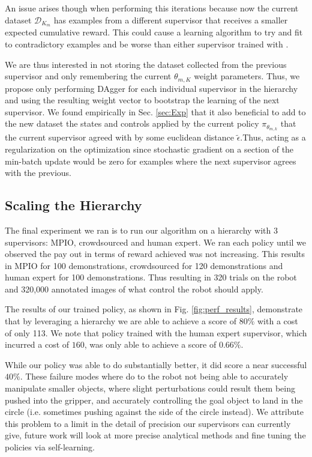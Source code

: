 \documentclass[10pt, conference]{ieeeconf}      %
\begin{document}
An issue arises though when performing this iterations because now the current dataset $\mathcal{D}_{K_m}$ has examples from a different supervisor that receives a smaller expected cumulative reward. This could cause a learning algorithm to try and fit to contradictory examples  and be worse than either supervisor trained with \cite{scholkopf2002learning}.

We are thus interested in not storing the dataset collected from the previous supervisor and only remembering the current $\theta_{m,K}$ weight parameters. Thus, we propose only performing DAgger for each individual supervisor in the hierarchy and using the resulting weight vector to bootstrap the learning of the next supervisor. We found empirically in Sec. \ref{sec:Exp} that it also beneficial to add to the new dataset the states and controls applied by the current policy $\pi_{\theta_{m,k}}$ that the current supervisor agreed with by some euclidean distance $\tilde{\epsilon}$.Thus, acting as a regularization on the optimization since stochastic gradient on a section of the min-batch update would be zero for examples where the next supervisor agrees with the previous. 



\subsection{Scaling the Hierarchy}
The final experiment we ran is to run our algorithm on a hierarchy with 3 supervisors: MPIO, crowdsourced and human expert. We ran each policy until we observed the pay out in terms of reward achieved was not increasing. This results in MPIO for 100 demonstrations, crowdsourced for 120 demonstrations and human expert for 100 demonstrations. Thus resulting in 320 trials on the robot and 320,000 annotated images of what control the robot should apply. 

The results of our trained policy, as shown in Fig. \ref{fig:perf_results}, demonstrate that by leveraging a hierarchy we are able to achieve a score of $80\%$ with a cost of only 113. We note that policy trained with the human expert supervisor, which incurred a cost of $160$, was only able to achieve a score of $0.66\%$. 

While our policy was able to do substantially better, it did score a near successful  $40\%$. These failure modes where do to the robot not being able to accurately manipulate smaller objects, where slight perturbations could result them being pushed into the gripper, and accurately controlling the goal object to land in the circle (i.e. sometimes pushing against the side of the circle instead). We attribute this problem to a limit in the detail of precision our supervisors can currently give, future work will look at more precise analytical methods and fine tuning the policies via self-learning. 
\end{document}
